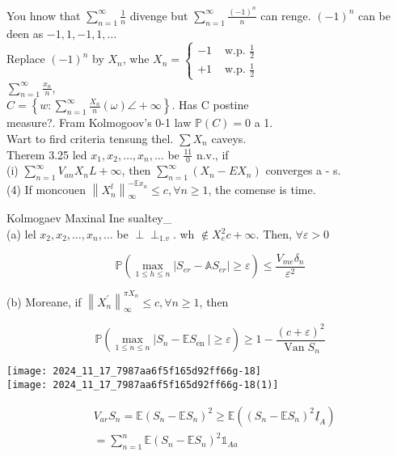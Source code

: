 \documentclass[11pt]{amsbook}
\theoremstyle{plain}%
\theoremstyle{definition}
\theoremstyle{remark}
\def\Perp{\perp\!\!\!\perp}
\begin{document}
You hnow that $\sum_{n=1}^{\infty} \frac{1}{n}$ divenge but $\sum_{n=1}^{\infty} \frac{(-1)^{n}}{n}$ can renge. $(-1)^{n}$ can be deen as $-1,1,-1,1, \ldots$\\
Replace $(-1)^{n}$ by $X_{n}$, whe $X_{n}= \begin{cases}-1 & \text { w.p. } \frac{1}{2} \\ +1 & \text { w.p. } \frac{1}{2}\end{cases}$\\
$\sum_{n=1}^{\infty} \frac{x_{n}}{n}$,\\
$C=\left\{w: \sum_{n=1}^{\infty} \frac{X_{n}}{n}(\omega) \angle+\infty\right\}$. Has C postine\\
measure?. Fram Kolmogoov's 0-1 law $\mathbb{P}(C)=0$ a 1.\\
Wart to fird criteria tensung thel. $\sum X_{n}$ caveys.\\
Therem 3.25 led $x_{1}, x_{2}, \ldots, x_{n}, \ldots$ be $\frac{11}{0}$ n.v., if\\
(i) $\sum_{n=1}^{\infty} V_{a n} X_{n} L+\infty$, then $\sum_{n=1}^{\infty}\left(X_{n}-E X_{n}\right)$ converges a - s.\\
(4) If moncouen $\left\|X_{n}^{l}\right\|_{\infty}^{-\mathbb{E} x_{n}} \leqslant c, \forall n \geqslant 1$, the comense is time.

Kolmogaev Maxinal Ine sualtey\_\\
(a) lel $x_{2}, x_{2}, \ldots, x_{n}, \ldots$ be $\Perp_{1 . v}$. wh $\notin X_{e}^{2} c+\infty$. Then, $\forall \varepsilon>0$

$$
\mathbb{P}\left(\max _{1 \leq h \leq n}\left|S_{e r}-\mathbb{A} S_{e r}\right| \geqslant \varepsilon\right) \leqslant \frac{V_{m e} \delta_{n}}{\varepsilon^{2}}
$$

(b) Moreane, if $\left\|X_{n}^{\prime}\right\|_{\infty}^{\pi X_{n}} \leq c, \forall n \geqslant 1$, then

$$
\mathbb{P}\left(\max _{1 \leqslant n \leqslant n}\left|S_{n}-\mathbb{E} S_{\text {en }}\right| \geqslant \varepsilon\right) \geqslant 1-\frac{(c+\varepsilon)^{2}}{\operatorname{Van} S_{n}}
$$

\texttt{[image: 2024\_11\_17\_7987aa6f5f165d92ff66g-18]}\\
\texttt{[image: 2024\_11\_17\_7987aa6f5f165d92ff66g-18(1)]}

$$
\begin{aligned}
& V_{a r} S_{n}=\mathbb{E}\left(S_{n}-\mathbb{E} S_{n}\right)^{2} \geqslant \mathbb{E}\left(\left(S_{n}-\mathbb{E} S_{n}\right)^{2} \underline{I}_{A}\right) \\
& =\sum_{n=1}^{n} \mathbb{E}\left(S_{n}-\mathbb{E} S_{n}\right)^{2} \mathbb{1}_{A a}
\end{aligned}
$$
\end{document}
